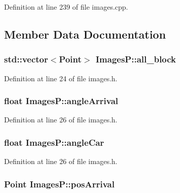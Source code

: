 Definition at line 239 of file images.\-cpp.



\subsection{Member Data Documentation}
\hypertarget{class_images_p_ab9e279526694a7ce421cfa11b9309ed1}{
\subsubsection[{all\-\_\-block}]{\setlength{\rightskip}{0pt plus 5cm}std\-::vector$<$Point$>$ Images\-P\-::all\-\_\-block}}\label{class_images_p_ab9e279526694a7ce421cfa11b9309ed1}


Definition at line 24 of file images.\-h.

\hypertarget{class_images_p_a408c61aeceb9175481adb2daca707a48}{
\subsubsection[{angle\-Arrival}]{\setlength{\rightskip}{0pt plus 5cm}float Images\-P\-::angle\-Arrival}}\label{class_images_p_a408c61aeceb9175481adb2daca707a48}


Definition at line 26 of file images.\-h.

\hypertarget{class_images_p_a39c69bdd9469b4b8a2c9666e27afa7b0}{
\subsubsection[{angle\-Car}]{\setlength{\rightskip}{0pt plus 5cm}float Images\-P\-::angle\-Car}}\label{class_images_p_a39c69bdd9469b4b8a2c9666e27afa7b0}


Definition at line 26 of file images.\-h.

\hypertarget{class_images_p_a621b649c63d3967849103c03082af64c}{
\subsubsection[{pos\-Arrival}]{\setlength{\rightskip}{0pt plus 5cm}Point Images\-P\-::pos\-Arrival}}\label{class_images_p_a621b649c63d3967849103c03082af64c}



